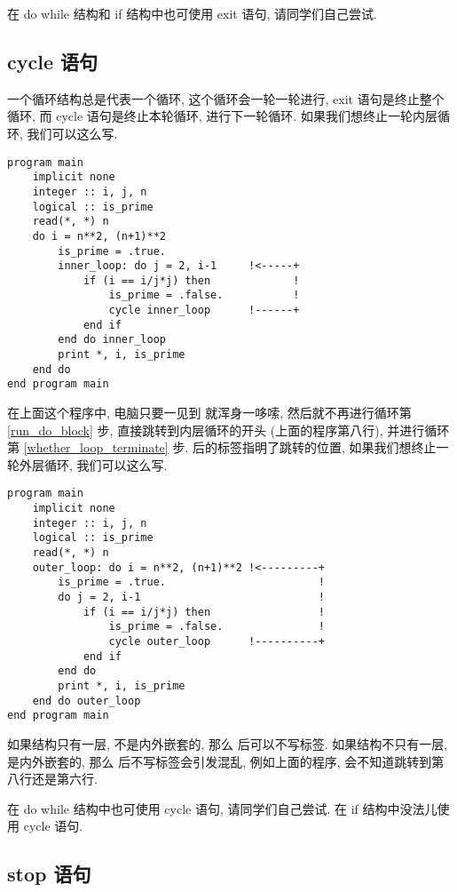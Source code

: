 在 do while 结构和 if 结构中也可使用 exit 语句, 请同学们自己尝试.

\subsection{cycle 语句}\label{fortran_cycle}

一个循环结构总是代表一个循环, 这个循环会一轮一轮进行, exit 语句是终止整个循环, 而 cycle 语句是终止本轮循环, 进行下一轮循环. 如果我们想终止一轮内层循环, 我们可以这么写.
\begin{lstlisting}
program main
    implicit none
    integer :: i, j, n
    logical :: is_prime
    read(*, *) n
    do i = n**2, (n+1)**2
        is_prime = .true.
        inner_loop: do j = 2, i-1     !<-----+
            if (i == i/j*j) then             !
                is_prime = .false.           !
                cycle inner_loop      !------+
            end if
        end do inner_loop
        print *, i, is_prime
    end do
end program main
\end{lstlisting}
在上面这个程序中, 电脑只要一见到  就浑身一哆嗦, 然后就不再进行循环第 \ref{run_do_block} 步, 直接跳转到内层循环的开头 (上面的程序第八行), 并进行循环第 \ref{whether_loop_terminate} 步.  后的标签指明了跳转的位置, 如果我们想终止一轮外层循环, 我们可以这么写.
\begin{lstlisting}
program main
    implicit none
    integer :: i, j, n
    logical :: is_prime
    read(*, *) n
    outer_loop: do i = n**2, (n+1)**2 !<---------+
        is_prime = .true.                        !
        do j = 2, i-1                            !
            if (i == i/j*j) then                 !
                is_prime = .false.               !
                cycle outer_loop      !----------+
            end if
        end do
        print *, i, is_prime
    end do outer_loop
end program main
\end{lstlisting}

如果结构只有一层, 不是内外嵌套的, 那么  后可以不写标签. 如果结构不只有一层, 是内外嵌套的, 那么  后不写标签会引发混乱, 例如上面的程序, 会不知道跳转到第八行还是第六行.

在 do while 结构中也可使用 cycle 语句, 请同学们自己尝试. 在 if 结构中没法儿使用 cycle 语句.

\subsection{stop 语句}

